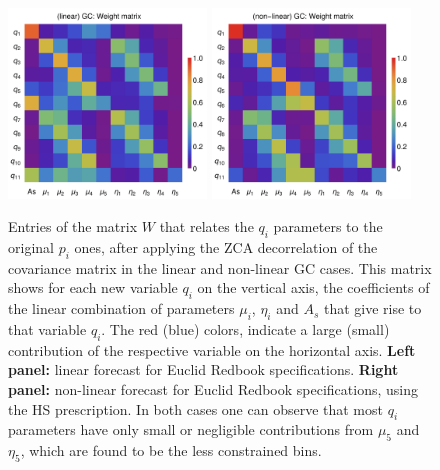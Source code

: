 \begin{figure}[htbp]
	\centering
	\includegraphics[width=0.47\textwidth]{Chapters/linear-nonlinear-MG-forecasts/figures/Decorrelations-GC/Weight_Matrix_ZCA_SquareNorm--_fiducialMGBin3_Euclid_GC_linearPK_}
	\includegraphics[width=0.47\textwidth]{Chapters/linear-nonlinear-MG-forecasts/figures/Decorrelations-GC/Weight_Matrix_ZCA_SquareNorm--_fiducialMGBin3_Euclid_GC_nonlinearPk__Zhao_}
	\caption[Weight matrix for ZCA decorrelation in a Euclid GC case.]{\label{fig:Wmat-ZCA-GC}
	Entries of the matrix $W$ that relates the $q_i$ parameters to the original $p_i$ ones, after applying the ZCA decorrelation of the covariance matrix in the linear and non-linear GC cases. This matrix shows for each new variable $q_i$ on the vertical axis, the coefficients of the linear combination of parameters $\mu_i$, $\eta_i$ and $A_s$ that give rise to that variable $q_i$. The red (blue) colors, indicate a large (small) contribution of the respective variable on the horizontal axis. \textbf{Left panel:} linear forecast for Euclid Redbook specifications.
\textbf{Right panel:} non-linear forecast for Euclid Redbook specifications, using the HS prescription.
In both cases one can observe that most $q_i$ parameters have only small or negligible contributions from $\mu_5$  and $\eta_5$, which are found to be the less constrained bins.
    }
\end{figure}


